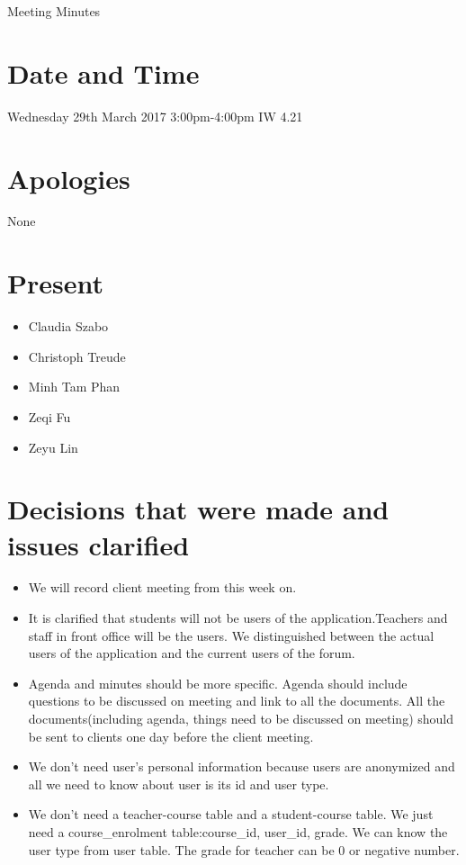 \documentclass[11pt, a4paper]{article}
\begin{document}
\vspace*{15pt}

\begin{center}
\huge Meeting Minutes




\end{center}

\section{Date and Time}
 Wednesday 29th March 2017 3:00pm-4:00pm IW 4.21

\section{Apologies}
None

\section{Present}
\begin{itemize}
	\item Claudia Szabo 
	\item Christoph Treude 
	\item Minh Tam Phan
	\item Zeqi Fu
	\item Zeyu Lin
\end{itemize}

\section{Decisions that were made and issues clarified}
\begin{itemize}
	\item We will record client meeting from this week on.
	\item It is clarified that students will not be users of the application.Teachers and staff in front office will be the users. We distinguished between the actual users of the application and the current users of the forum.
	\item Agenda and minutes should be more specific. Agenda should include questions to be discussed on meeting and link to all the documents. All the documents(including agenda, things need to be discussed on meeting) should be sent to clients one day before the client meeting.
	\item We don't need user's personal information because users are anonymized and all we need to know about user is its id and user type.
	\item We don't need a teacher-course table and a student-course table. We just need a course\_enrolment table:course\_id, user\_id, grade. We can know the user type from user table. The grade for teacher can be 0 or negative number.
\end{itemize}
\end{document}
